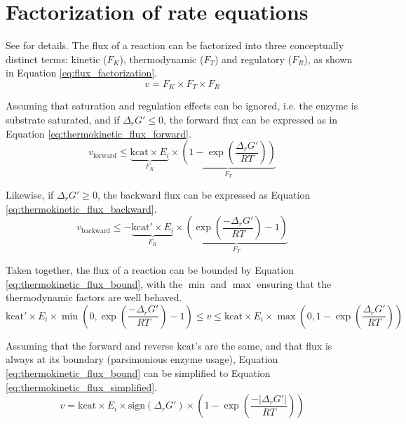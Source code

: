 
\section{Factorization of rate equations}
See \cite{noor2013note} for details. The flux of a reaction can be factorized into three
conceptually distinct terms: kinetic ($F_K$), thermodynamic ($F_T$) and regulatory ($F_R$),
as shown in Equation \ref{eq:flux_factorization}.
\begin{equation}
    v = F_K \times F_T \times F_R
    \label{eq:flux_factorization}
\end{equation}

Assuming that saturation and regulation effects can be ignored, i.e. the enzyme is substrate
saturated, and if $\Delta_r G' \leq 0$, the forward flux can be expressed as in Equation \ref{eq:thermokinetic_flux_forward}.
\begin{equation}
    v_\text{forward} \leq \underbrace{\text{kcat} \times E_i}_{F_K} \times \underbrace{\left(1 - \exp \left( \frac{\Delta_r G'}{RT} \right)\right)}_{F_T}
    \label{eq:thermokinetic_flux_forward}
\end{equation}

Likewise, if $\Delta_r G' \geq 0$, the backward flux can be expressed as Equation \ref{eq:thermokinetic_flux_backward}.
\begin{equation}
    v_\text{backward} \leq -\underbrace{\text{kcat}' \times E_i}_{F_K} \times \underbrace{\left(\exp \left( \frac{-\Delta_r G'}{RT}\right) - 1\right)}_{F_T}
    \label{eq:thermokinetic_flux_backward}
\end{equation}

Taken together, the flux of a reaction can be bounded by Equation \ref{eq:thermokinetic_flux_bound},
with the $\min$ and $\max$ ensuring that the thermodynamic factors are well behaved.
\begin{equation}
    \text{kcat}' \times E_i \times \min{\left(0, \exp \left( \frac{-\Delta_r G'}{RT}\right) - 1\right)} \leq v \leq \text{kcat} \times E_i \times \max \left(0, 1 - \exp \left( \frac{\Delta_r G'}{RT} \right)\right)
    \label{eq:thermokinetic_flux_bound}
\end{equation}

Assuming that the forward and reverse $\text{kcat}$'s are the same, and that flux is always
at its boundary (parsimonious enzyme usage), Equation \ref{eq:thermokinetic_flux_bound} can be
simplified to Equation \ref{eq:thermokinetic_flux_simplified}.
\begin{equation}
    v = \text{kcat} \times E_i \times \text{sign}\left(\Delta_r G' \right) \times \left(1 - \exp \left( \frac{-|\Delta_r G'|}{RT} \right)\right)
    \label{eq:thermokinetic_flux_simplified}
\end{equation}

